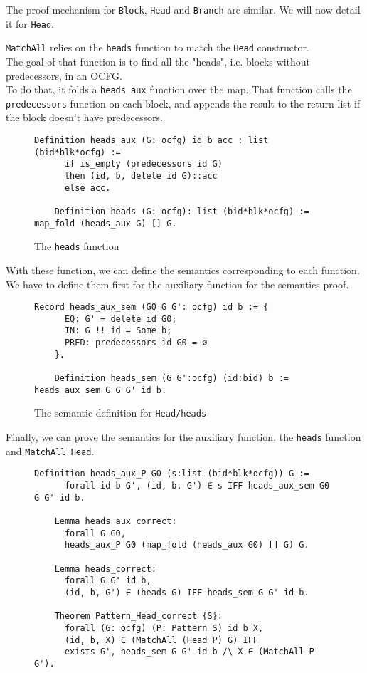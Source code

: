 \documentclass[11pt]{article}
\newcommand{\inlinecoq}[1]{\mbox{\lstinline[style=customcoq,columns=fixed,basewidth=.48em]{#1}}}
\newcommand{\ilc}[1]{\inlinecoq{#1}}
\begin{document}
The proof mechanism for \ilc{Block}, \ilc{Head} and \ilc{Branch} are similar. We will now detail it for \ilc{Head}.

\ilc{MatchAll} relies on the \ilc{heads} function to match the \ilc{Head} constructor.\\
The goal of that function is to find all the "heads", i.e. blocks without predecessors, in an OCFG.\\
To do that, it folds a \ilc{heads_aux} function over the map. That function calls the \ilc{predecessors} function on each block, and appends the result to the return list if the block doesn't have predecessors.

\begin{figure}[H]
  \begin{lstlisting}[style=customcoq,basicstyle=\small\ttfamily]
    Definition heads_aux (G: ocfg) id b acc : list (bid*blk*ocfg) :=
      if is_empty (predecessors id G)
      then (id, b, delete id G)::acc
      else acc.

    Definition heads (G: ocfg): list (bid*blk*ocfg) := map_fold (heads_aux G) [] G.
  \end{lstlisting}
  \caption{The \ilc{heads} function}
  \label{fig:heads_fun}
\end{figure}

With these function, we can define the semantics corresponding to each function. We have to define them first for the auxiliary function for the semantics proof.

\begin{figure}[H]
  \begin{lstlisting}[style=customcoq,basicstyle=\small\ttfamily]
    Record heads_aux_sem (G0 G G': ocfg) id b := {
      EQ: G' = delete id G0;
      IN: G !! id = Some b;
      PRED: predecessors id G0 = ∅
    }.

    Definition heads_sem (G G':ocfg) (id:bid) b := heads_aux_sem G G G' id b.
  \end{lstlisting}
  \caption{The semantic definition for \ilc{Head/heads}}
  \label{fig:sem_block_def}
\end{figure}

Finally, we can prove the semantics for the auxiliary function, the \ilc{heads} function and \ilc{MatchAll Head}.

\begin{figure}[H]
  \label{fig:block_cor}
  \begin{lstlisting}[style=customcoq,basicstyle=\small\ttfamily]
    Definition heads_aux_P G0 (s:list (bid*blk*ocfg)) G :=
      forall id b G', (id, b, G') ∈ s IFF heads_aux_sem G0 G G' id b.

    Lemma heads_aux_correct:
      forall G G0,
      heads_aux_P G0 (map_fold (heads_aux G0) [] G) G.

    Lemma heads_correct:
      forall G G' id b,
      (id, b, G') ∈ (heads G) IFF heads_sem G G' id b.

    Theorem Pattern_Head_correct {S}:
      forall (G: ocfg) (P: Pattern S) id b X,
      (id, b, X) ∈ (MatchAll (Head P) G) IFF
      exists G', heads_sem G G' id b /\ X ∈ (MatchAll P G').
  \end{lstlisting}
\end{figure}
\end{document}
